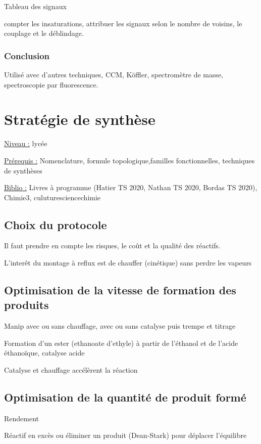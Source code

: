\documentclass{article}%
\begin{document}
Tableau des signaux

compter les insaturations, attribuer les signaux selon le nombre de voisins, le couplage et le déblindage.

\subsubsection{Conclusion}

Utilisé avec d'autres techniques, CCM, Köffler, spectromètre de masse, spectroscopie par fluorescence.

\section{Stratégie de synthèse}
\underline{Niveau :} lycée

\underline{Prérequis :} Nomenclature, formule topologique,familles fonctionnelles, techniques de synthèses

\underline{Biblio :} Livres à programme (Hatier TS 2020, Nathan TS 2020, Bordas TS 2020), Chimie3, culuturesciencechimie



\subsection{Choix du protocole}

Il faut prendre en compte les risques, le coût et la qualité des réactifs.

L'interêt du montage à reflux est de chauffer (cinétique) sans perdre les vapeurs

\subsection{Optimisation de la vitesse de formation des produits}
Manip avec ou sans chauffage, avec ou sans catalyse puis trempe et titrage

Formation d'un ester (ethanoate d'ethyle) à partir de l'éthanol et de l'acide éthanoïque, catalyse acide 

Catalyse et chauffage accélèrent la réaction

\subsection{Optimisation de la quantité de produit formé}

Rendement

Réactif en excès ou éliminer un produit (Dean-Stark) pour déplacer l'équilibre
\end{document}
